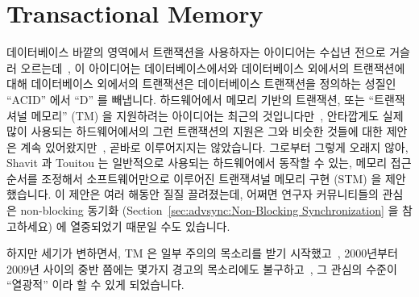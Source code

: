 
\section{Transactional Memory}
\label{sec:future:Transactional Memory}

데이터베이스 바깥의 영역에서 트랜잭션을 사용하자는 아이디어는 수십년 전으로
거슬러 오르는데~\cite{DBLomet1977SIGSOFT}, 이 아이디어는 데이터베이스에서와
데이터베이스 외에서의 트랜잭션에 대해 데이터베이스 외에서의 트랜잭션은
데이터베이스 트랜잭션을 정의하는 성질인 ``ACID'' 에서 ``D'' 를 빼냅니다.
하드웨어에서 메모리 기반의 트랜잭션, 또는 ``트랜잭셔널 메모리'' (TM) 을
지원하려는 아이디어는 최근의 것입니다만~\cite{Herlihy93a}, 안타깝게도 실제 많이
사용되는 하드웨어에서의 그런 트랜잭션의 지원은 그와 비슷한 것들에 대한 제안은
계속 있어왔지만~\cite{JMStone93}, 곧바로 이루어지지는 않았습니다.
그로부터 그렇게 오래지 않아, Shavit 과 Touitou 는 일반적으로 사용되는
하드웨어에서 동작할 수 있는, 메모리 접근 순서를 조정해서 소프트웨어만으로
이루어진 트랜잭셔널 메모리 구현 (STM) 을 제안했습니다.
이 제안은 여러 해동안 질질 끌려졌는데, 어쩌면 연구자 커뮤니티들의 관심은
non-blocking 동기화 (Section~\ref{sec:advsync:Non-Blocking Synchronization} 을
참고하세요) 에 열중되었기 때문일 수도 있습니다.

하지만 세기가 변하면서, TM 은 일부 주의의 목소리를 받기
시작했고~\cite{Blundell2005DebunkTM,McKenney2007PLOSTM}, 2000년부터 2009년
사이의 중반 쯤에는 몇가지 경고의 목소리에도
불구하고~\cite{MauriceHerlihy2005-TM-manifesto.pldi,DanGrossman2007TMGCAnalogy},
그 관심의 수준이 ``열광적'' 이라 할 수 있게 되었습니다.
\iffalse

